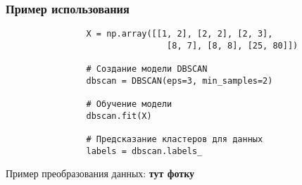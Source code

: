 			
		\subsubsection{Пример использования}
			\begin{verbatim}
				X = np.array([[1, 2], [2, 2], [2, 3],
              					[8, 7], [8, 8], [25, 80]])

				# Создание модели DBSCAN
				dbscan = DBSCAN(eps=3, min_samples=2)

				# Обучение модели
				dbscan.fit(X)

				# Предсказание кластеров для данных
				labels = dbscan.labels_
			\end{verbatim}
			
			
			Пример преобразования данных:
				\textbf{тут фотку}
	
	







